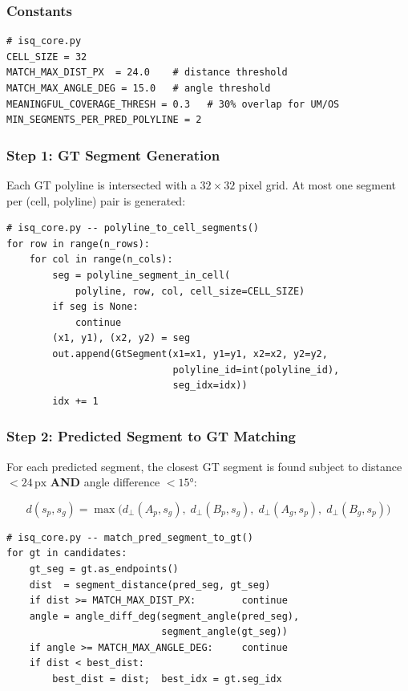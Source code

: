 \documentclass[11pt,a4paper]{article}
\begin{document}
\subsubsection{Constants}

\begin{lstlisting}
# isq_core.py
CELL_SIZE = 32
MATCH_MAX_DIST_PX  = 24.0    # distance threshold
MATCH_MAX_ANGLE_DEG = 15.0   # angle threshold
MEANINGFUL_COVERAGE_THRESH = 0.3   # 30% overlap for UM/OS
MIN_SEGMENTS_PER_PRED_POLYLINE = 2
\end{lstlisting}

\subsubsection{Step 1: GT Segment Generation}

Each GT polyline is intersected with a $32 \times 32$ pixel grid.
At most one segment per (cell, polyline) pair is generated:

\begin{lstlisting}
# isq_core.py -- polyline_to_cell_segments()
for row in range(n_rows):
    for col in range(n_cols):
        seg = polyline_segment_in_cell(
            polyline, row, col, cell_size=CELL_SIZE)
        if seg is None:
            continue
        (x1, y1), (x2, y2) = seg
        out.append(GtSegment(x1=x1, y1=y1, x2=x2, y2=y2,
                             polyline_id=int(polyline_id),
                             seg_idx=idx))
        idx += 1
\end{lstlisting}

\subsubsection{Step 2: Predicted Segment to GT Matching}

For each predicted segment, the closest GT segment is found subject to
distance $< 24\,\text{px}$ \textbf{AND} angle difference $< 15°$:

\[
d(s_p, s_g) = \max\bigl(
  d_\perp(A_p, s_g),\; d_\perp(B_p, s_g),\;
  d_\perp(A_g, s_p),\; d_\perp(B_g, s_p)\bigr)
\]

\begin{lstlisting}
# isq_core.py -- match_pred_segment_to_gt()
for gt in candidates:
    gt_seg = gt.as_endpoints()
    dist  = segment_distance(pred_seg, gt_seg)
    if dist >= MATCH_MAX_DIST_PX:        continue
    angle = angle_diff_deg(segment_angle(pred_seg),
                           segment_angle(gt_seg))
    if angle >= MATCH_MAX_ANGLE_DEG:     continue
    if dist < best_dist:
        best_dist = dist;  best_idx = gt.seg_idx
\end{lstlisting}
\end{document}
